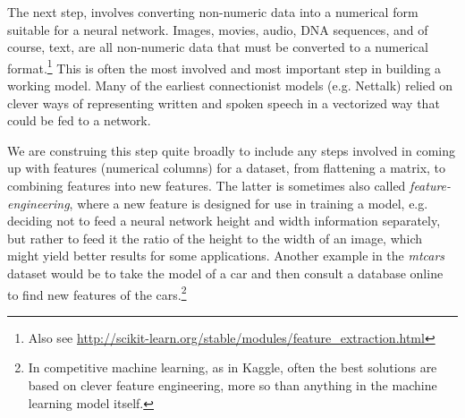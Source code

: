 The next step,   involves converting non-numeric data into a numerical form suitable for a neural network. Images, movies, audio, DNA sequences, and of course, text, are all non-numeric data that must be converted to a numerical format.\footnote{Also see \url{http://scikit-learn.org/stable/modules/feature_extraction.html}} This is often the most involved and  most important step in building a working model. Many of the earliest connectionist models (e.g. Nettalk) relied on clever ways of representing written and spoken speech in a vectorized way that could be fed to a network.

We are construing this step quite broadly to include any steps involved in coming up with features (numerical columns) for a dataset, from flattening a matrix, to combining features into new features. The latter is sometimes also called \emph{feature-engineering}, where a new feature is designed for use in training a model, e.g. deciding not to feed a neural network height and width information separately, but rather to feed it the ratio of the height to the width of an image, which might yield better results for some applications. Another example in the \emph{mtcars} dataset would be to take the model of a car and then consult a database online to find new features of the cars.\footnote{In competitive machine learning, as in Kaggle, often the best solutions are based on clever feature engineering, more so than anything in the machine learning model itself.}

